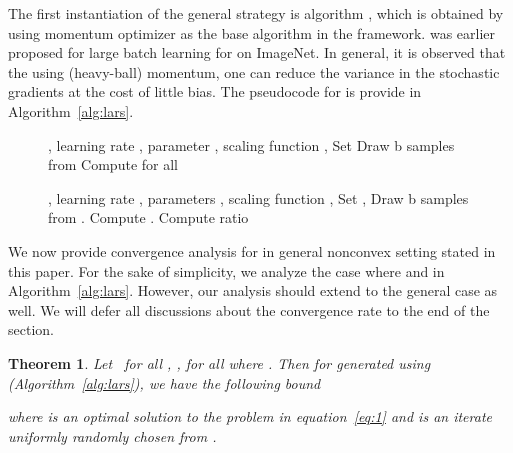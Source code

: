 \documentclass{article} \usepackage{iclr2020_conference,times}
\def\eqref#1{equation~\ref{#1}}
\newtheorem{theorem}{Theorem}
\begin{document}
The first instantiation of the general strategy is  algorithm \citep{you2017scaling}, which is obtained by using momentum optimizer as the base algorithm  in the framework.  was earlier proposed for large batch learning for  on ImageNet. In general, it is observed that the using (heavy-ball) momentum, one can reduce the variance in the stochastic gradients at the cost of little bias. The pseudocode for  is provide in Algorithm~\ref{alg:lars}.

\begin{figure}
\begin{minipage}[b]{.48\textwidth}
\begin{algorithm}[H]\small
	\caption{}
	\label{alg:lars}
	\begin{algorithmic}
		 , learning rate , parameter , scaling function , 
		\STATE Set 
		\STATE Draw b samples  from 
        \STATE Compute 
        \STATE 
		\STATE  for all 
		\ENDFOR
	\end{algorithmic}
\end{algorithm}
\end{minipage}\hfill \begin{minipage}[b]{.5\textwidth}
\begin{algorithm}[H]\small
	\caption{}
	\label{alg:lamb}
	\begin{algorithmic}
		 , learning rate ,  parameters , scaling function , 
		\STATE Set , 
		\FOR{ {\bf to} }
		\STATE Draw b samples  from .
        \STATE Compute .
		\STATE   
		\STATE  
		\STATE  
        \STATE 
		\STATE Compute ratio 
		\STATE 
		\ENDFOR
	\end{algorithmic}
\end{algorithm}
\end{minipage}
\end{figure}

We now provide convergence analysis for  in general nonconvex setting stated in this paper. For the sake of simplicity, we analyze the case where  and  in Algorithm~\ref{alg:lars}. However, our analysis should extend to the general case as well. We will defer all discussions about the convergence rate to the end of the section.

\begin{theorem}
\label{thm:lars-conv}
Let  \ for all , ,  for all  where . Then for  generated using  (Algorithm~\ref{alg:lars}), we have the following bound

where  is an optimal solution to the problem in \eqref{eq:1} and  is an iterate uniformly randomly chosen from .
\end{theorem}
\end{document}
